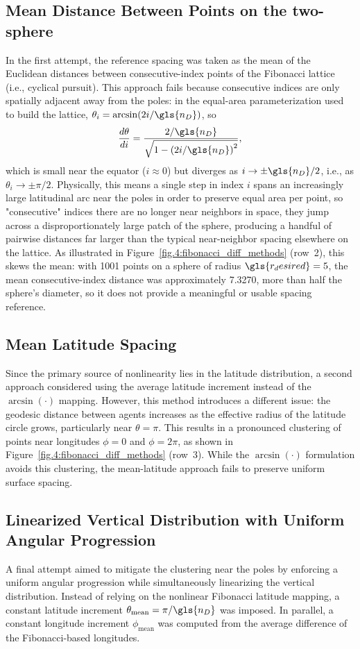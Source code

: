 \subsection{Mean Distance Between Points on the two-sphere}
In the first attempt, the reference spacing was taken as the mean of the Euclidean distances between consecutive-index points of the Fibonacci lattice (i.e., cyclical pursuit). This approach fails because consecutive indices are only spatially adjacent away from the poles: in the equal-area parameterization used to build the lattice, $\theta_i = \arcsin(2i/\gls{n_D})$, so
\[
\frac{d\theta}{di} = \frac{2/\gls{n_D}}{\sqrt{1-\left(2i/\gls{n_D}\right)^2}},
\]
which is small near the equator ($i \approx 0$) but diverges as $i \to \pm \gls{n_D}/2$, i.e., as $\theta_i \to \pm\pi/2$. Physically, this means a single step in index $i$ spans an increasingly large latitudinal arc near the poles in order to preserve equal area per point, so "consecutive" indices there are no longer near neighbors in space, they jump across a disproportionately large patch of the sphere, producing a handful of pairwise distances far larger than the typical near-neighbor spacing elsewhere on the lattice. As illustrated in Figure~\ref{fig.4:fibonacci_diff_methods} (row~2), this skews the mean: with 1001 points on a sphere of radius $\gls{r_desired} = 5$, the mean consecutive-index distance was approximately 7.3270, more than half the sphere's diameter, so it does not provide a meaningful or usable spacing reference.

\subsection{Mean Latitude Spacing}
Since the primary source of nonlinearity lies in the latitude distribution, a second approach considered using the average latitude increment instead of the $\arcsin(\cdot)$ mapping. However, this method introduces a different issue: the geodesic distance between agents increases as the effective radius of the latitude circle grows, particularly near $\theta = \pi$. This results in a pronounced clustering of points near longitudes $\phi = 0$ and $\phi = 2\pi$, as shown in Figure~\ref{fig.4:fibonacci_diff_methods} (row~3). While the $\arcsin(\cdot)$ formulation avoids this clustering, the mean-latitude approach fails to preserve uniform surface spacing.

\subsection{Linearized Vertical Distribution with Uniform Angular Progression}
A final attempt aimed to mitigate the clustering near the poles by enforcing a uniform angular progression while simultaneously linearizing the vertical distribution. Instead of relying on the nonlinear Fibonacci latitude mapping, a constant latitude increment $\theta_{\text{mean}} = \pi / \gls{n_D}$ was imposed. In parallel, a constant longitude increment $\phi_{\text{mean}}$ was computed from the average difference of the Fibonacci-based longitudes.

